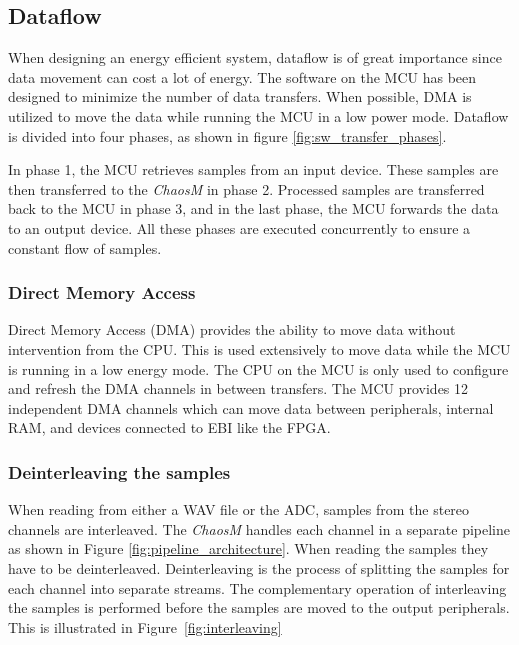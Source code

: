 
\subsection{Dataflow}

When designing an energy efficient system, dataflow is of great importance since
data movement can cost a lot of energy. The software on the MCU
has been designed to minimize the number of data transfers. When
possible, DMA is utilized to move the data while running the MCU in a low power
mode. Dataflow is divided into four phases, as shown in figure
\ref{fig:sw_transfer_phases}.

In phase 1, the MCU retrieves samples from an input device. These samples
are then transferred to the \textit{ChaosM} in phase 2. Processed samples are transferred back to the MCU in phase 3, and in the
last phase, the MCU forwards the data to an output device. All these
phases are executed concurrently to ensure a constant flow of samples.



\subsubsection{Direct Memory Access}

Direct Memory Access (DMA) provides the ability to move data without
intervention from the CPU. This is used extensively to move data while the
MCU is running in a low energy mode. The CPU on the MCU is only used to
configure and refresh the DMA channels in between transfers. The MCU provides 12
independent DMA channels which can move data between peripherals, internal RAM,
and devices connected to EBI like the FPGA.

% 

\subsubsection{Deinterleaving the samples}

When reading from either a WAV file or the ADC, samples from the stereo channels
are interleaved. The \textit{ChaosM} handles each channel in a separate pipeline as shown
in Figure \ref{fig:pipeline_architecture}. When reading the samples they have to be
deinterleaved. Deinterleaving is the process of splitting the samples for each
channel into separate streams. The complementary operation of interleaving the
samples is performed before the samples are moved to the output peripherals. This is
illustrated in Figure~\ref{fig:interleaving}

